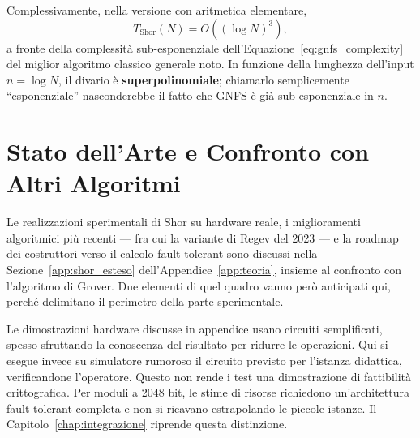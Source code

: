 \begin{onehalfspace}
Complessivamente, nella versione con aritmetica elementare,
\[
T_{\text{Shor}}(N) = O\!\left((\log N)^3\right),
\]
a fronte della complessità sub-esponenziale dell'Equazione~\eqref{eq:gnfs_complexity} del miglior algoritmo classico generale noto. In funzione della lunghezza dell'input $n=\log N$, il divario è \textbf{superpolinomiale}; chiamarlo semplicemente ``esponenziale'' nasconderebbe il fatto che GNFS è già sub-esponenziale in $n$.

\section{Stato dell'Arte e Confronto con Altri Algoritmi}
\label{sec:shor_stato_arte}

Le realizzazioni sperimentali di Shor su hardware reale, i miglioramenti algoritmici più recenti --- fra cui la variante di Regev del 2023 --- e la roadmap dei costruttori verso il calcolo fault-tolerant sono discussi nella Sezione~\ref{app:shor_esteso} dell'Appendice~\ref{app:teoria}, insieme al confronto con l'algoritmo di Grover. Due elementi di quel quadro vanno però anticipati qui, perché delimitano il perimetro della parte sperimentale.

Le dimostrazioni hardware discusse in appendice usano circuiti semplificati, spesso sfruttando la conoscenza del risultato per ridurre le operazioni. Qui si esegue invece su simulatore rumoroso il circuito previsto per l'istanza didattica, verificandone l'operatore. Questo non rende i test una dimostrazione di fattibilità crittografica. Per moduli a 2048 bit, le stime di risorse richiedono un'architettura fault-tolerant completa e non si ricavano estrapolando le piccole istanze. Il Capitolo~\ref{chap:integrazione} riprende questa distinzione.

\end{onehalfspace}
